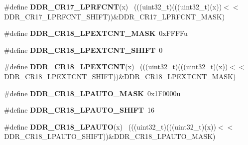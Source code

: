 \begin{DoxyCompactItemize}
\item 
\hypertarget{group___d_d_r___register___masks_gaa03587cbfe28fe7b218ffa364dd6dab3}{}\#define {\bfseries D\+D\+R\+\_\+\+C\+R17\+\_\+\+L\+P\+R\+F\+C\+N\+T}(x)                                        ~(((uint32\+\_\+t)(((uint32\+\_\+t)(x))$<$$<$D\+D\+R\+\_\+\+C\+R17\+\_\+\+L\+P\+R\+F\+C\+N\+T\+\_\+\+S\+H\+I\+F\+T))\&D\+D\+R\+\_\+\+C\+R17\+\_\+\+L\+P\+R\+F\+C\+N\+T\+\_\+\+M\+A\+S\+K)\label{group___d_d_r___register___masks_gaa03587cbfe28fe7b218ffa364dd6dab3}

\item 
\hypertarget{group___d_d_r___register___masks_ga7cb46ef24b625bb42add2be2b6914b85}{}\#define {\bfseries D\+D\+R\+\_\+\+C\+R18\+\_\+\+L\+P\+E\+X\+T\+C\+N\+T\+\_\+\+M\+A\+S\+K}~0x\+F\+F\+F\+Fu\label{group___d_d_r___register___masks_ga7cb46ef24b625bb42add2be2b6914b85}

\item 
\hypertarget{group___d_d_r___register___masks_ga4210dc544f8bbaa004c9ec9ac07fc1ef}{}\#define {\bfseries D\+D\+R\+\_\+\+C\+R18\+\_\+\+L\+P\+E\+X\+T\+C\+N\+T\+\_\+\+S\+H\+I\+F\+T}~0\label{group___d_d_r___register___masks_ga4210dc544f8bbaa004c9ec9ac07fc1ef}

\item 
\hypertarget{group___d_d_r___register___masks_gaab53f32dd437d2e05cd69f3d357cd484}{}\#define {\bfseries D\+D\+R\+\_\+\+C\+R18\+\_\+\+L\+P\+E\+X\+T\+C\+N\+T}(x)                                      ~(((uint32\+\_\+t)(((uint32\+\_\+t)(x))$<$$<$D\+D\+R\+\_\+\+C\+R18\+\_\+\+L\+P\+E\+X\+T\+C\+N\+T\+\_\+\+S\+H\+I\+F\+T))\&D\+D\+R\+\_\+\+C\+R18\+\_\+\+L\+P\+E\+X\+T\+C\+N\+T\+\_\+\+M\+A\+S\+K)\label{group___d_d_r___register___masks_gaab53f32dd437d2e05cd69f3d357cd484}

\item 
\hypertarget{group___d_d_r___register___masks_gac1380327bc5b0e5e9dc8df58518eff52}{}\#define {\bfseries D\+D\+R\+\_\+\+C\+R18\+\_\+\+L\+P\+A\+U\+T\+O\+\_\+\+M\+A\+S\+K}~0x1\+F0000u\label{group___d_d_r___register___masks_gac1380327bc5b0e5e9dc8df58518eff52}

\item 
\hypertarget{group___d_d_r___register___masks_ga510239b1d59fe892348074f86e912f4f}{}\#define {\bfseries D\+D\+R\+\_\+\+C\+R18\+\_\+\+L\+P\+A\+U\+T\+O\+\_\+\+S\+H\+I\+F\+T}~16\label{group___d_d_r___register___masks_ga510239b1d59fe892348074f86e912f4f}

\item 
\hypertarget{group___d_d_r___register___masks_gab8dc306131fa512c2b80deef72b025a0}{}\#define {\bfseries D\+D\+R\+\_\+\+C\+R18\+\_\+\+L\+P\+A\+U\+T\+O}(x)                                          ~(((uint32\+\_\+t)(((uint32\+\_\+t)(x))$<$$<$D\+D\+R\+\_\+\+C\+R18\+\_\+\+L\+P\+A\+U\+T\+O\+\_\+\+S\+H\+I\+F\+T))\&D\+D\+R\+\_\+\+C\+R18\+\_\+\+L\+P\+A\+U\+T\+O\+\_\+\+M\+A\+S\+K)\label{group___d_d_r___register___masks_gab8dc306131fa512c2b80deef72b025a0}


\end{DoxyCompactItemize}
